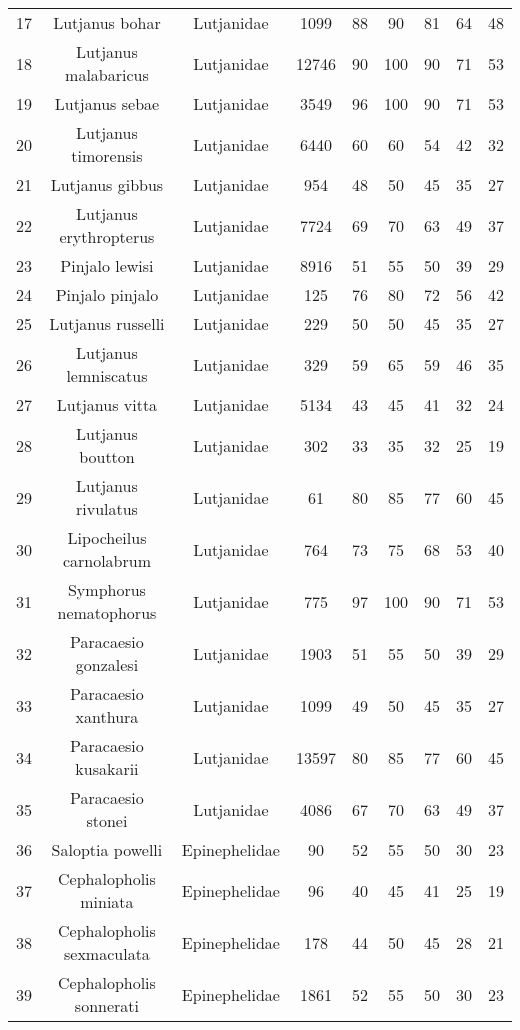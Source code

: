 {\begin{longtable}{ccccccccc}
  17 & Lutjanus bohar & Lutjanidae & 1099 & 88 & 90 & 81 & 64 & 48 \\ 
  18 & Lutjanus malabaricus & Lutjanidae & 12746 & 90 & 100 & 90 & 71 & 53 \\ 
  19 & Lutjanus sebae & Lutjanidae & 3549 & 96 & 100 & 90 & 71 & 53 \\ 
  20 & Lutjanus timorensis & Lutjanidae & 6440 & 60 & 60 & 54 & 42 & 32 \\ 
  21 & Lutjanus gibbus & Lutjanidae & 954 & 48 & 50 & 45 & 35 & 27 \\ 
  22 & Lutjanus erythropterus & Lutjanidae & 7724 & 69 & 70 & 63 & 49 & 37 \\ 
  23 & Pinjalo lewisi & Lutjanidae & 8916 & 51 & 55 & 50 & 39 & 29 \\ 
  24 & Pinjalo pinjalo & Lutjanidae & 125 & 76 & 80 & 72 & 56 & 42 \\ 
  25 & Lutjanus russelli & Lutjanidae & 229 & 50 & 50 & 45 & 35 & 27 \\ 
  26 & Lutjanus lemniscatus & Lutjanidae & 329 & 59 & 65 & 59 & 46 & 35 \\ 
  27 & Lutjanus vitta & Lutjanidae & 5134 & 43 & 45 & 41 & 32 & 24 \\ 
  28 & Lutjanus boutton & Lutjanidae & 302 & 33 & 35 & 32 & 25 & 19 \\ 
  29 & Lutjanus rivulatus & Lutjanidae & 61 & 80 & 85 & 77 & 60 & 45 \\ 
  30 & Lipocheilus carnolabrum & Lutjanidae & 764 & 73 & 75 & 68 & 53 & 40 \\ 
  31 & Symphorus nematophorus & Lutjanidae & 775 & 97 & 100 & 90 & 71 & 53 \\ 
  32 & Paracaesio gonzalesi & Lutjanidae & 1903 & 51 & 55 & 50 & 39 & 29 \\ 
  33 & Paracaesio xanthura & Lutjanidae & 1099 & 49 & 50 & 45 & 35 & 27 \\ 
  34 & Paracaesio kusakarii & Lutjanidae & 13597 & 80 & 85 & 77 & 60 & 45 \\ 
  35 & Paracaesio stonei & Lutjanidae & 4086 & 67 & 70 & 63 & 49 & 37 \\ 
  36 & Saloptia powelli & Epinephelidae & 90 & 52 & 55 & 50 & 30 & 23 \\ 
  37 & Cephalopholis miniata & Epinephelidae & 96 & 40 & 45 & 41 & 25 & 19 \\ 
  38 & Cephalopholis sexmaculata & Epinephelidae & 178 & 44 & 50 & 45 & 28 & 21 \\ 
  39 & Cephalopholis sonnerati & Epinephelidae & 1861 & 52 & 55 & 50 & 30 & 23 \\ 

\end{longtable}}
